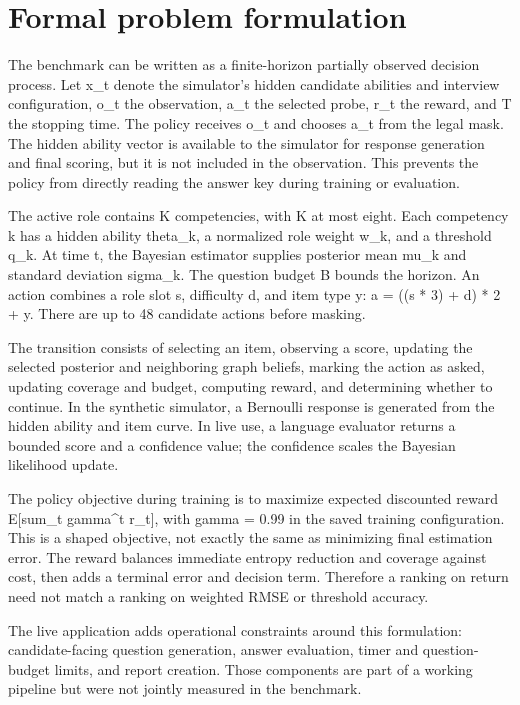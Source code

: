 \documentclass{ieeeaccess}
\begin{document}
\section{Formal problem formulation}

The benchmark can be written as a finite-horizon partially observed decision process. Let x\_t denote the simulator's hidden candidate abilities and interview configuration, o\_t the observation, a\_t the selected probe, r\_t the reward, and T the stopping time. The policy receives o\_t and chooses a\_t from the legal mask. The hidden ability vector is available to the simulator for response generation and final scoring, but it is not included in the observation. This prevents the policy from directly reading the answer key during training or evaluation.

The active role contains K competencies, with K at most eight. Each competency k has a hidden ability theta\_k, a normalized role weight w\_k, and a threshold q\_k. At time t, the Bayesian estimator supplies posterior mean mu\_k and standard deviation sigma\_k. The question budget B bounds the horizon. An action combines a role slot s, difficulty d, and item type y: a = ((s * 3) + d) * 2 + y. There are up to 48 candidate actions before masking.

The transition consists of selecting an item, observing a score, updating the selected posterior and neighboring graph beliefs, marking the action as asked, updating coverage and budget, computing reward, and determining whether to continue. In the synthetic simulator, a Bernoulli response is generated from the hidden ability and item curve. In live use, a language evaluator returns a bounded score and a confidence value; the confidence scales the Bayesian likelihood update.

The policy objective during training is to maximize expected discounted reward E[sum\_t gamma\textasciicircum{}t r\_t], with gamma = 0.99 in the saved training configuration. This is a shaped objective, not exactly the same as minimizing final estimation error. The reward balances immediate entropy reduction and coverage against cost, then adds a terminal error and decision term. Therefore a ranking on return need not match a ranking on weighted RMSE or threshold accuracy.

The live application adds operational constraints around this formulation: candidate-facing question generation, answer evaluation, timer and question-budget limits, and report creation. Those components are part of a working pipeline but were not jointly measured in the benchmark.
\end{document}

